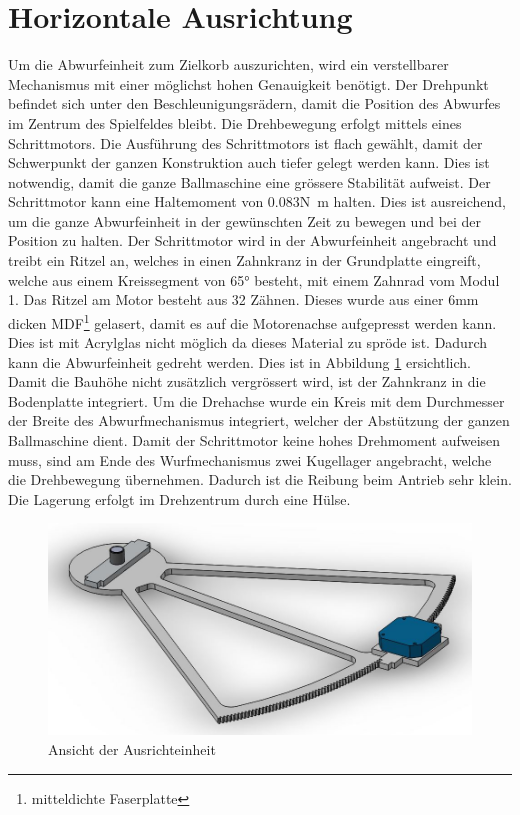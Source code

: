 \section{Horizontale Ausrichtung}
	
    Um die Abwurfeinheit zum Zielkorb auszurichten, wird ein verstellbarer Mechanismus 
    mit einer möglichst hohen Genauigkeit benötigt. Der Drehpunkt befindet sich unter den Beschleunigungsrädern, 
    damit die Position des Abwurfes im Zentrum des Spielfeldes bleibt. Die Drehbewegung erfolgt 
    mittels eines Schrittmotors. Die Ausführung des Schrittmotors ist flach gewählt, damit 
    der Schwerpunkt der ganzen Konstruktion auch tiefer gelegt werden kann. Dies ist notwendig, 
    damit die ganze Ballmaschine eine grössere Stabilität aufweist. Der Schrittmotor kann eine
    Haltemoment von 0.083\si{\newton\meter} halten. Dies ist ausreichend, um die ganze 
    Abwurfeinheit in der gewünschten Zeit zu bewegen und bei der Position zu halten. Der Schrittmotor wird in der Abwurfeinheit angebracht und treibt ein Ritzel an, welches in einen Zahnkranz in der Grundplatte 
    eingreift, welche aus einem Kreissegment von 65\si{\degree} besteht, 
    mit einem Zahnrad vom Modul 1. Das Ritzel am Motor besteht aus 32 Zähnen. Dieses wurde aus einer 
    6\si{\milli\meter} dicken MDF\footnote{mitteldichte Faserplatte} gelasert, damit es auf 
    die Motorenachse aufgepresst werden kann. Dies ist mit Acrylglas nicht möglich da dieses 
    Material zu spröde ist. Dadurch kann die Abwurfeinheit gedreht werden. Dies ist in Abbildung 
    \ref{abb:Ausrichteinheit} ersichtlich. Damit die Bauhöhe nicht zusätzlich 
    vergrössert wird, ist der Zahnkranz in die Bodenplatte integriert. Um die Drehachse wurde ein Kreis 
    mit dem Durchmesser der Breite des Abwurfmechanismus integriert, welcher der Abstützung 
    der ganzen Ballmaschine dient. 
    Damit der Schrittmotor keine hohes Drehmoment aufweisen muss, sind am Ende des Wurfmechanismus 
    zwei Kugellager angebracht, welche die Drehbewegung übernehmen. Dadurch ist die Reibung beim Antrieb sehr klein. Die Lagerung erfolgt im Drehzentrum durch eine Hülse.
    \begin{figure}[h!]
    	\includegraphics[width=1\textwidth,clip,trim=0mm 2mm 0mm 7mm]
    	{Enddokumentation/Bilder/Ausrichteinheit.jpg}
    	\centering
    	\caption{Ansicht der Ausrichteinheit}
    	\label{abb:Ausrichteinheit}
    \end{figure}
